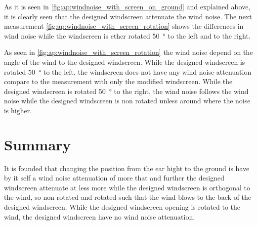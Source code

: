 As it is seen in \autoref{fig:ap:windnoise_with_screen_on_ground} and explained above, it is clearly seen that the designed windscreen attenuate the wind noise. The next measurement \autoref{fig:ap:windnoise_with_screen_rotation} shows the differences in wind noise while the windscreen is ether rotated \SI{50}{\degree} to the left and to the right.  

As seen in \autoref{fig:ap:windnoise_with_screen_rotation} the wind noise depend on the angle of the wind to the designed windscreen. While the designed windscreen is rotated \SI{50}{\degree} to the left, the windscreen does not have any wind noise attenuation compare to the measurement with only the modified windscreen. While the designed windscreen is rotated \SI{50}{\degree} to the right, the wind noise follows the wind noise while the designed windscreen is non rotated unless around  where the noise is  higher.   


\section*{Summary}
It is founded that changing the position from the ear hight to the ground is have by it self a wind noise attenuation of more that  and further the designed windscreen attenuate at less  more while the designed windscreen is orthogonal to the wind, so non rotated and rotated such that the wind blows to the back of the designed windscreen. While the designed windscreen opening is rotated to the wind, the designed windscreen have no wind noise attenuation.




